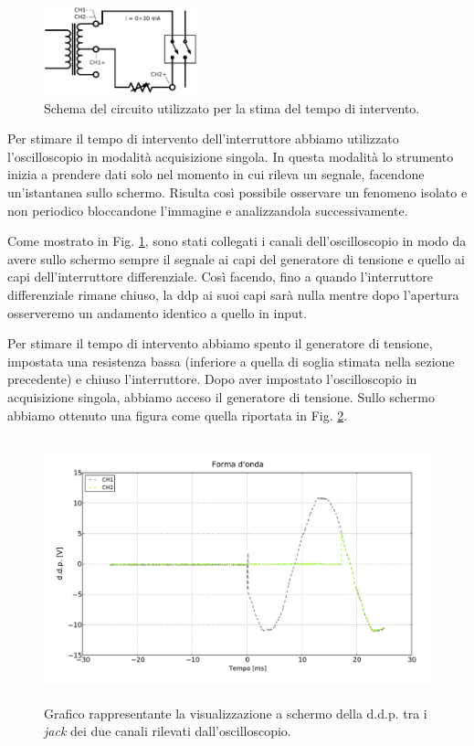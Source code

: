 \begin{figure}
	\centering
    \includegraphics[width=0.40\textwidth]{time.pdf}
    \caption{Schema del circuito utilizzato per la stima del tempo di intervento.}
    \label{fig:time}
\end{figure}

Per stimare il tempo di intervento dell'interruttore abbiamo utilizzato l'oscilloscopio in modalità acquisizione singola. In questa modalità lo strumento inizia a prendere dati solo nel momento in cui rileva un segnale, facendone un'istantanea sullo schermo. Risulta così possibile osservare un fenomeno isolato e non periodico bloccandone l'immagine e analizzandola successivamente.

Come mostrato in Fig. \ref{fig:time}, sono stati collegati i canali dell'oscilloscopio in modo da avere sullo schermo sempre il segnale ai capi del generatore di tensione e quello ai capi dell'interruttore differenziale. Così facendo, fino a quando l'interruttore differenziale rimane chiuso, la ddp ai suoi capi sarà nulla mentre dopo l'apertura osserveremo un andamento identico a quello in input.

Per stimare il tempo di intervento abbiamo spento il generatore di tensione, impostata una resistenza bassa (inferiore a quella di soglia stimata nella sezione precedente) e chiuso l'interruttore. Dopo aver impostato l'oscilloscopio in acquisizione singola, abbiamo acceso il generatore di tensione. Sullo schermo abbiamo ottenuto una figura come quella riportata in Fig. \ref{fig:graph}.

\begin{figure}[h]
	\centering
    \includegraphics[height=3in]{graph.pdf}
    \caption{Grafico rappresentante la visualizzazione a schermo della d.d.p. tra i \emph{jack} dei due canali rilevati dall'oscilloscopio.}
    \label{fig:graph}
\end{figure}


